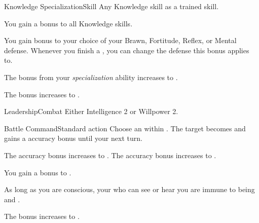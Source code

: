   \begin{feat}{Knowledge Specialization}{Skill}
    \featpre Any Knowledge skill as a trained skill.

     You gain a  bonus to all Knowledge skills.

     You gain  bonus to your choice of your Brawn, Fortitude, Reflex, or Mental defense.
    Whenever you finish a , you can change the defense this bonus applies to.

     The bonus from your \textit{specialization} ability increases to .

     The bonus increases to .
  \end{feat}

  \begin{feat}{Leadership}{Combat}
    \featpre Either Intelligence 2 or Willpower 2.

    \begin{activeability}{Battle Command}{Standard action}
      \abilitytags \atAuditory
      \rankline
      Choose an  within \medrange.
      The target becomes \focused and gains a  accuracy bonus until your next turn.

      \rankline
       The accuracy bonus increases to .
       The accuracy bonus increases to .
    \end{activeability}

     You gain a  bonus to .

     As long as you are conscious, your  who can see or hear you are immune to being \frightened and \panicked.

     The bonus increases to .
  \end{feat}

